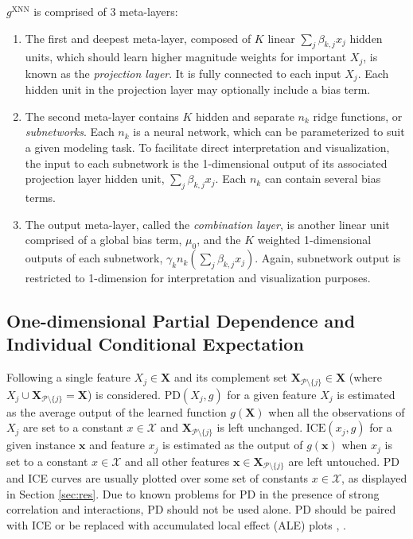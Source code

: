 \documentclass[information,article,submit,moreauthors,pdftex]{definitions/mdpi}
\begin{document}
\noindent $g^{\text{XNN}}$ is comprised of 3 meta-layers:

\begin{enumerate}[leftmargin=*,labelsep=4.9mm]
	\item The first and deepest meta-layer, composed of $K$ linear $\sum_j\beta_{k,j}x_j$ hidden units, which should learn higher magnitude weights for important $X_j$, is known as the \textit{projection layer}. It is fully connected to each input $X_j$. Each hidden unit in the projection layer may optionally include a bias term.
	\item The second meta-layer contains $K$ hidden and separate $n_k$ ridge functions, or \textit{subnetworks}. Each $n_k$ is a neural network, which can be parameterized to suit a given modeling task. To facilitate direct interpretation and visualization, the input to each subnetwork is the 1-dimensional output of its associated projection layer hidden unit, $\sum_j\beta_{k,j}x_j$. Each $n_k$ can contain several bias terms.
	\item The output meta-layer, called the \textit{combination layer}, is another linear unit comprised of a global bias term, $\mu_0$, and the $K$ weighted 1-dimensional outputs of each subnetwork, $\gamma_kn_k(\sum_j\beta_{k,j}x_j)$. Again, subnetwork output is restricted to 1-dimension for interpretation and visualization purposes.
\end{enumerate}

\subsection{One-dimensional Partial Dependence and Individual Conditional Expectation}\label{a_ssec:pd_ice}

Following \citet{esl} a single feature $X_j \in \mathbf{X}$ and its complement set $\mathbf{X}_{\mathcal{P} \setminus \{j\}} \in \mathbf{X}$ (where $X_j \cup \mathbf{X}_{\mathcal{P} \setminus \{j\}} = \mathbf{X}$) is considered. $\text{PD}(X_j, g)$ for a given feature $X_j$ is estimated as the average output of the learned function $g(\mathbf{X})$ when all the observations of $X_j$ are set to a constant $x \in \mathcal{X}$ and $\mathbf{X}_{\mathcal{P} \setminus \{j\}}$ is left unchanged. $\text{ICE}(x_j, g)$ for a given instance $\mathbf{x}$ and feature $x_j$ is estimated as the output of $g(\mathbf{x})$ when $x_j$ is set to a constant $x \in \mathcal{X}$ and all other features $\mathbf{x} \in \mathbf{X}_{\mathcal{P} \setminus \{j\}}$ are left untouched. PD and ICE curves are usually plotted over some set of constants $x \in \mathcal{X}$, as displayed in Section \ref{sec:res}. Due to known problems for PD in the presence of strong correlation and interactions, PD should not be used alone. PD should be paired with ICE or be replaced with accumulated local effect (ALE) plots \cite{ice_plots}, \cite{ale_plot}.
\end{document}

